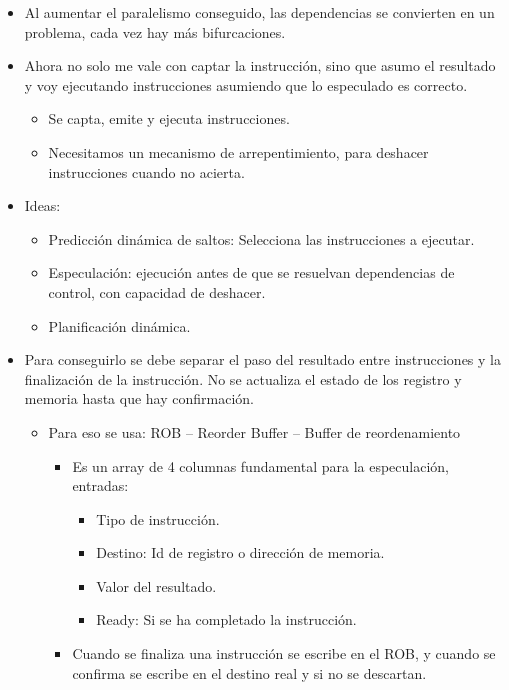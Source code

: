 \documentclass[12pt, twoside, openright]{report} %
\begin{document}
  \begin{itemize}
  
  \item
    Al aumentar el paralelismo conseguido, las dependencias se
    convierten en un problema, cada vez hay más bifurcaciones.
  \item
    Ahora no solo me vale con captar la instrucción, sino que asumo el
    resultado y voy ejecutando instrucciones asumiendo que lo especulado
    es correcto.

    \begin{itemize}
    
    \item
      Se capta, emite y ejecuta instrucciones.
    \item
      Necesitamos un mecanismo de arrepentimiento, para deshacer
      instrucciones cuando no acierta.
    \end{itemize}
  \item
    Ideas:

    \begin{itemize}
    
    \item
      Predicción dinámica de saltos: Selecciona las instrucciones a
      ejecutar.
    \item
      Especulación: ejecución antes de que se resuelvan dependencias de
      control, con capacidad de deshacer.
    \item
      Planificación dinámica.
    \end{itemize}
  \item
    Para conseguirlo se debe separar el paso del resultado entre
    instrucciones y la finalización de la instrucción. No se actualiza
    el estado de los registro y memoria hasta que hay confirmación.

    \begin{itemize}
    
    \item
      Para eso se usa: ROB -- Reorder Buffer -- Buffer de reordenamiento

      \begin{itemize}
      
      \item
        Es un array de 4 columnas fundamental para la especulación,
        entradas:

        \begin{itemize}
        
        \item
          Tipo de instrucción.
        \item
          Destino: Id de registro o dirección de memoria.
        \item
          Valor del resultado.
        \item
          Ready: Si se ha completado la instrucción.
        \end{itemize}
        \item
      Cuando se finaliza una instrucción se escribe en el ROB, y cuando
      se confirma se escribe en el destino real y si no se descartan.
      

\end{itemize}
\end{itemize}
\end{itemize}
\end{document}
